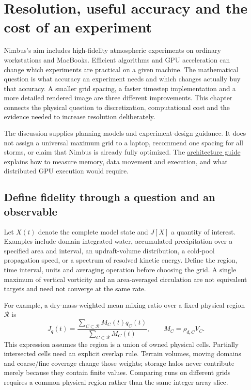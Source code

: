 \chapter{Resolution, useful accuracy and the cost of an experiment}
\label{mathematics-resolution}

Nimbus's aim includes high-fidelity atmospheric experiments on ordinary
workstations and MacBooks. Efficient algorithms and GPU acceleration can
change which experiments are practical on a given machine. The mathematical
question is what accuracy an experiment needs and which changes actually buy
that accuracy. A smaller grid spacing, a faster timestep implementation and a
more detailed rendered image are three different improvements. This chapter
connects the physical question to discretization, computational cost and the
evidence needed to increase resolution deliberately.

The discussion supplies planning models and experiment-design guidance. It
does not assign a universal maximum grid to a laptop, recommend one spacing
for all storms, or claim that Nimbus is already fully optimized. The
\href{ARCHITECTURE.pdf}{architecture guide} explains how to measure memory,
data movement and execution, and what distributed GPU execution would require.

\section{Define fidelity through a question and an observable}

Let $X(t)$ denote the complete model state and $J[X]$ a quantity of interest.
Examples include domain-integrated water, accumulated precipitation over a
specified area and interval, an updraft-volume distribution, a cold-pool
propagation speed, or a spectrum of resolved kinetic energy. Define the region,
time interval, units and averaging operation before choosing the grid. A
single maximum of vertical vorticity and an area-averaged circulation are not
equivalent targets and need not converge at the same rate.

For example, a dry-mass-weighted mean mixing ratio over a fixed physical region
$\mathcal R$ is
\[
 J_q(t)=\frac{\displaystyle\sum_{C\subset\mathcal R}M_C(t)q_C(t)}
              {\displaystyle\sum_{C\subset\mathcal R}M_C(t)},
 \qquad M_C=\rho_{d,C}V_C.
\]
This expression assumes the region is a union of owned physical cells.
Partially intersected cells need an explicit overlap rule. Terrain volumes,
moving domains and coarse/fine coverage change those weights; storage halos
never contribute merely because they contain finite values. Comparing runs
on different grids requires a common physical region rather than the same
integer array slice.

